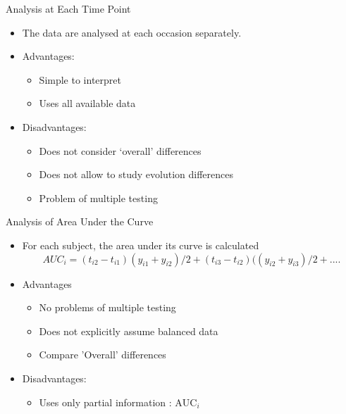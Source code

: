\documentclass{beamer}
\begin{document}
\begin{frame}{Analysis at Each Time Point}
\begin{itemize}
\item The data are analysed at each occasion separately. \vspace{0.25cm}
\item Advantages: \vspace{0.25cm}
\begin{itemize}
	\item Simple to interpret \vspace{0.25cm}
	\item Uses all available data \vspace{0.25cm}
\end{itemize}
\item Disadvantages: \vspace{0.25cm}
\begin{itemize}
	\item Does not consider ‘overall’ differences \vspace{0.25cm}
	\item Does not allow to study evolution differences \vspace{0.25cm}
	\item Problem of multiple testing
\end{itemize}
\end{itemize}
\end{frame}

\begin{frame}{Analysis of Area Under the Curve}
\begin{itemize}
	\item For each subject, the area under its curve is calculated
	 \begin{equation}
	AUC_{i} = (t_{i2}- t_{i1})  (y_{i1} + y_{i2})/2 + (t_{i3}-t_{i2})((y_{i2} + y_{i3})/2 +  ....
	\end{equation}
	\item Advantages  \vspace{0.25cm}
	\begin{itemize}
	\item  No problems of multiple testing \vspace{0.25cm}
    \item Does not explicitly assume balanced data \vspace{0.25cm}
    \item Compare 'Overall' differences \vspace{0.25cm}
	\end{itemize}
	\item Disadvantages: \vspace{0.25cm}
	\begin{itemize}
   \item Uses only partial information :  $\mbox{AUC}_{i}$
	\end{itemize}
\end{itemize}
\end{frame}
\end{document}
